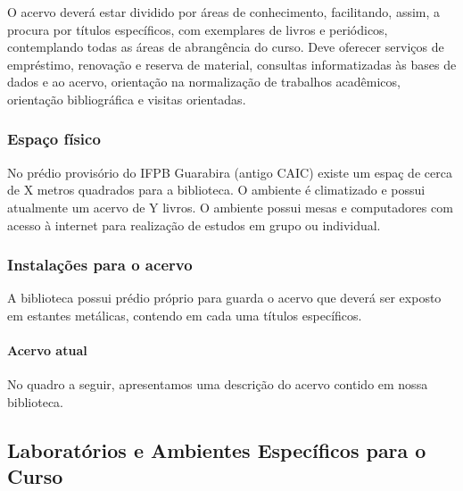 O acervo deverá estar dividido por áreas de conhecimento, facilitando, assim, a procura por títulos específicos, com exemplares de livros e periódicos, contemplando todas as áreas de abrangência do curso. Deve oferecer serviços de empréstimo, renovação e reserva de material, consultas informatizadas às bases de dados e ao acervo, orientação na normalização de trabalhos acadêmicos, orientação bibliográfica e visitas orientadas.

\subsubsection{Espa\c{c}o f\'isico}

No pr\'edio provis\'orio do IFPB Guarabira (antigo CAIC) existe um espa\c{c} de cerca de X metros quadrados para a biblioteca. O ambiente \'e climatizado e possui atualmente um acervo de Y livros. O ambiente possui mesas e computadores com acesso \`a internet para realiza\c{c}\~ao de estudos em grupo ou individual.

\subsubsection{Instala\c{c}\~oes para o acervo}


A biblioteca possui prédio próprio para guarda o acervo que deverá ser exposto em estantes metálicas, contendo em cada uma títulos específicos. 


\paragraph{Acervo atual}

No quadro a seguir, apresentamos uma descrição do acervo contido em nossa biblioteca.

\subsection{Laborat\'orios e Ambientes Espec\'ificos para o Curso}



